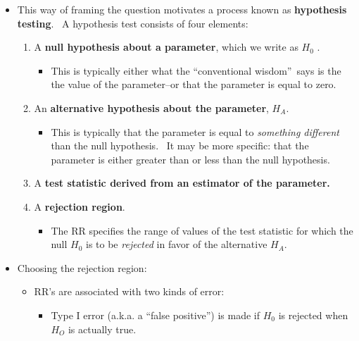 \documentclass[11pt]{article}
\begin{document}
\begin{itemize}
\item This way of framing the question motivates a process known as \textbf{%
hypothesis testing}. \ A hypothesis test consists of four elements:

\begin{enumerate}
\item A \textbf{null hypothesis about a parameter}, which we write as $H_{0}$%
.

\begin{itemize}
\item This is typically either what the \textquotedblleft conventional
wisdom\textquotedblright\ says is the the value of the parameter--or that
the parameter is equal to zero.
\end{itemize}

\item An \textbf{alternative hypothesis about the parameter}, $H_{A}$.

\begin{itemize}
\item This is typically that the parameter is equal to \textit{something
different }than the null hypothesis. \ It may be more specific: that the
parameter is either greater than or less than the null hypothesis.
\end{itemize}

\item A \textbf{test statistic derived from an estimator of the parameter.}

\item A \textbf{rejection region}.

\begin{itemize}
\item The RR specifies the range of values of the test statistic for which
the null $H_{0}$ is to be \textit{rejected }in favor of the alternative $%
H_{A}$.
\end{itemize}
\end{enumerate}

\item Choosing the rejection region:

\begin{itemize}
\item RR's are associated with two kinds of error:

\begin{itemize}
\item Type I error (a.k.a. a \textquotedblleft false
positive\textquotedblright ) is made if $H_{0}$ is rejected when $H_{O}$ is
actually true.


\end{itemize}
\end{itemize}
\end{itemize}
\end{document}

